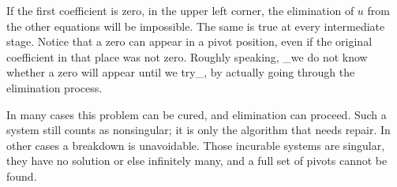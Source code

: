 If the first coefficient is zero, in the upper left corner, the elimination of \(u\) from the other equations will be impossible. The same is true at every intermediate stage. Notice that a zero can appear in a pivot position, even if the original coefficient in that place was not zero. Roughly speaking, _we do not know whether a zero will appear until we try_, by actually going through the elimination process.

In many cases this problem can be cured, and elimination can proceed. Such a system still counts as nonsingular; it is only the algorithm that needs repair. In other cases a breakdown is unavoidable. Those incurable systems are singular, they have no solution or else infinitely many, and a full set of pivots cannot be found.

 